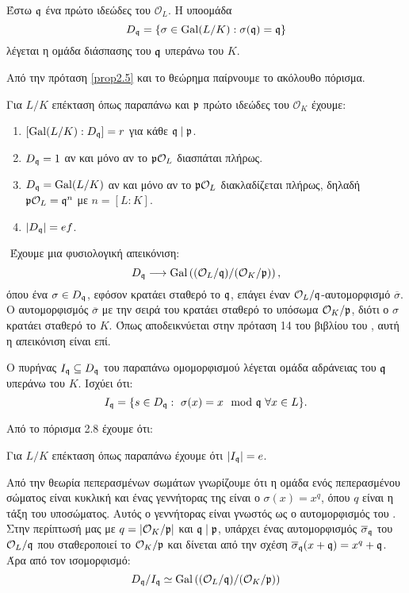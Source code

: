 \begin{defn}
	Έστω $\mathfrak{q}$ ένα πρώτο ιδεώδες του $\mathcal{O}_L$. Η υποομάδα $$D_{\mathfrak{q}} = \{\sigma \in \operatorname{Gal} (L/K): \sigma(\mathfrak{q}) = \mathfrak{q}\}$$ λέγεται η ομάδα διάσπασης του $\mathfrak{q}$ υπεράνω του $K$.
\end{defn}

\noindent Από την πρόταση \ref{prop2.5} και το θεώρημα  παίρνουμε το ακόλουθο πόρισμα.

\begin{cor} \label{cor2.8}
	Για $L/K$ επέκταση όπως παραπάνω και $\mathfrak{p}$ πρώτο ιδεώδες του $\mathcal{O}_K$ έχουμε:
	\begin{enumerate}
		\item $[\operatorname{Gal}(L/K) : D_{\mathfrak{q}}] = r$ για κάθε $\mathfrak{q} \mid \mathfrak{p}$.
		\item $D_{\mathfrak{q}} = 1$ αν και μόνο αν το $\mathfrak{p} \mathcal{O}_L$ διασπάται πλήρως.
		\item $D_{\mathfrak{q}} = \operatorname{Gal}(L/K)$ αν και μόνο αν το $\mathfrak{p} \mathcal{O}_L$ διακλαδίζεται πλήρως, δηλαδή $\mathfrak{p} \mathcal{O}_L = \mathfrak{q}^{n}$ με $n=[L:K]$.
		\item $|D_{\mathfrak{q}}| = ef$. 
	\end{enumerate}
\end{cor}

$ $\newline
Έχουμε μια φυσιολογική απεικόνιση:
$$D_{\mathfrak{q}} \longrightarrow \operatorname{Gal} \left( (\mathcal{O}_L/\mathfrak{q}) / (\mathcal{O}_K/\mathfrak{p})\right),$$ όπου ένα $\sigma \in D_{\mathfrak{q}}$, εφόσον κρατάει 
σταθερό το $\mathfrak{q}$, επάγει έναν $\mathcal{O}_L/\mathfrak{q}$-αυτομορφισμό $\overline{\sigma}$. Ο αυτομορφισμός $\overline{\sigma}$ με την σειρά του 
κρατάει σταθερό το υπόσωμα $\mathcal{O}_K/\mathfrak{p}$, διότι ο $\sigma$ κρατάει σταθερό το $K$. Όπως αποδεικνύεται στην πρόταση 14 του βιβλίου 
του  \cite{Lang1}, αυτή η απεικόνιση είναι επί. %

\begin{defn}
	Ο πυρήνας $I_{\mathfrak{q}} \subseteq D_{\mathfrak{q}}$ του παραπάνω ομομορφισμού λέγεται ομάδα αδράνειας του $\mathfrak{q}$ υπεράνω του $K$. Ισχύει ότι:
	$$I_{\q} = \{s \in D_{\q}: \ \sigma(x) = x \mod \q \ \forall x \in L\}.$$
\end{defn}

\noindent Από το πόρισμα 2.8 έχουμε ότι:
\begin{cor}
	Για $L/K$ επέκταση όπως παραπάνω έχουμε ότι $|I_{\mathfrak{q}}| = e$.
\end{cor}


\noindent Από την θεωρία πεπερασμένων σωμάτων γνωρίζουμε ότι η ομάδα  ενός πεπερασμένου σώματος είναι κυκλική και ένας 
γεννήτορας της είναι ο $\sigma(x) = x^q$, όπου $q$ είναι η τάξη του υποσώματος. Αυτός ο γεννήτορας είναι γνωστός ως ο αυτομορφισμός του 
. Στην περίπτωσή μας με $q = |\mathcal{O}_K/\mathfrak{p}|$ και $\mathfrak{q} \mid \mathfrak{p}$, υπάρχει ένας αυτομορφισμός $\overline{\sigma}_{\mathfrak{q}}$ 
του $\mathcal{O}_L/\mathfrak{q}$ που σταθεροποιεί το $\mathcal{O}_K/\mathfrak{p}$ και δίνεται από την σχέση $\overline{\sigma}_{\mathfrak{q}}(x + \mathfrak{q}) = x^q + \mathfrak{q}$. 
Άρα από τον ισομορφισμό:
$$D_{\mathfrak{q}}/ I_{\mathfrak{q}} \simeq \operatorname{Gal} \left( (\mathcal{O}_L/\mathfrak{q}) / (\mathcal{O}_K/\mathfrak{p}) \right)$$

